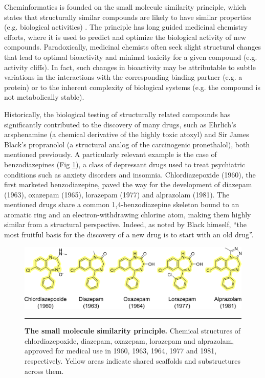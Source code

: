 Cheminformatics is founded on the small molecule similarity principle, which states that structurally similar compounds are likely to have similar properties (e.g. biological activities) \cite{johnson_concepts_1990}. The principle has long guided medicinal chemistry efforts, where it is used to predict and optimize the biological activity of new compounds. Paradoxically, medicinal chemists often seek slight structural changes that lead to optimal bioactivity and minimal toxicity for a given compound (e.g. activity cliffs). In fact, such changes in bioactivity may be attributable to subtle variations in the interactions with the corresponding binding partner (e.g. a protein) or to the inherent complexity of biological systems (e.g. the compound is not metabolically stable). 

Historically, the biological testing of structurally related compounds has significantly contributed to the discovery of many drugs, such as Ehrlich’s arsphenamine (a chemical derivative of the highly toxic atoxyl) and Sir James Black’s propranolol (a structural analog of the carcinogenic pronethalol), both mentioned previously. A particularly relevant example is the case of benzodiazepines (Fig \ref{Introduction_Fig1}), a class of depressant drugs used to treat psychiatric conditions such as anxiety disorders and insomnia. Chlordiazepoxide (1960), the first marketed benzodiazepine, paved the way for the development of diazepam (1963), oxazepam (1965), lorazepam (1977) and alprazolam (1981). The mentioned drugs share a common 1,4-benzodiazepine skeleton bound to an aromatic ring and an electron-withdrawing chlorine atom, making them highly similar from a structural perspective\cite{wick_history_2013, costa_clinical_1984}. Indeed, as noted by Black himself, “the most fruitful basis for the discovery of a new drug is to start with an old drug”\cite{pillaiyar_medicinal_2020, raju_nobel_2000}.

\begin{figure}[t!]
  \centering
  \includegraphics[width=\linewidth]{figures/Introduction/Benzodiazepines.png}
  \caption{
    \textbf{The small molecule similarity principle.} 
    Chemical structures of chlordiazepoxide, diazepam, oxazepam, lorazepam and alprazolam, approved for medical use in 1960, 1963, 1964, 1977 and 1981, respectively. Yellow areas indicate shared scaffolds and substructures across them.
  }
  \rule[0ex]{\textwidth}{0.5pt}
  \vspace{-5mm}
  \label{Introduction_Fig1}
\end{figure}


